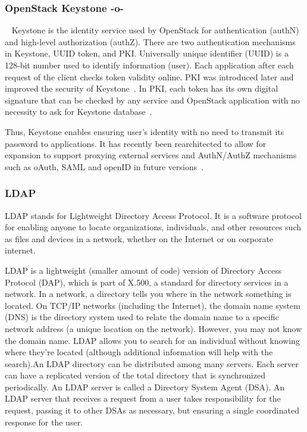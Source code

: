 \subsubsection{OpenStack Keystone -o-}
~\cite{www-keystone-wiki} Keystone is the identity service used by
OpenStack for authentication (authN) and high-level authorization
(authZ).  There are two authentication mechanisms in Keystone, UUID
token, and PKI.  Universally unique identifier (UUID) is a 128-bit
number used to identify information (user). Each
application after each request of the client checks token validity
online. PKI was introduced later and improved the security of
Keystone~\cite{cui2015security}. In PKI, each token has its
own digital signature that can be checked by any service and OpenStack
application with no necessity to ask for Keystone
database~\cite{www-cloudberrylab-kstn}.
 
Thus, Keystone enables ensuring user's identity with no need to
transmit its password to applications. It has recently been
rearchitected to allow for expansion to support proxying external
services and AuthN/AuthZ mechanisms such as oAuth, SAML and openID in
future versions~\cite{www-keystone}.

\subsubsection{LDAP}

LDAP stands for Lightweight Directory Access Protocol. It is a
software protocol for enabling anyone to locate organizations,
individuals, and other resources such as files and devices in a
network, whether on the Internet or on corporate
internet.~\cite{www-ldap}

     LDAP is a lightweight (smaller amount of code) version of
     Directory Access Protocol (DAP), which is part of X.500, a
     standard for directory services in a network.  In a network, a
     directory tells you where in the network something is located. On
     TCP/IP networks (including the Internet), the domain name system
     (DNS) is the directory system used to relate the domain name to a
     specific network address (a unique location on the
     network). However, you may not know the domain name. LDAP allows
     you to search for an individual without knowing where they're
     located (although additional information will help with the
     search).An LDAP directory can be distributed among many
     servers. Each server can have a replicated version of the total
     directory that is synchronized periodically.  An LDAP server is
     called a Directory System Agent (DSA). An LDAP server that
     receives a request from a user takes responsibility for the
     request, passing it to other DSAs as necessary, but ensuring a
     single coordinated response for the user.

